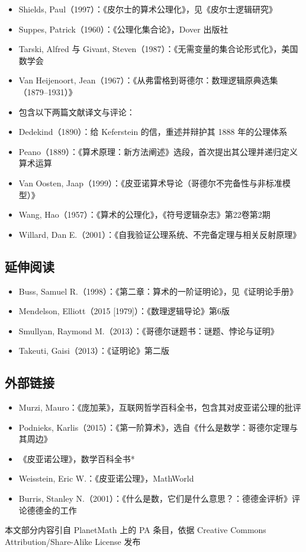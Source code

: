 \begin{itemize}
\item Shields, Paul（1997）：《皮尔士的算术公理化》，见《皮尔士逻辑研究》
\item Suppes, Patrick（1960）：《公理化集合论》，Dover 出版社
\item Tarski, Alfred 与 Givant, Steven（1987）：《无需变量的集合论形式化》，美国数学会
\item Van Heijenoort, Jean（1967）：《从弗雷格到哥德尔：数理逻辑原典选集（1879–1931）》
\item 包含以下两篇文献译文与评论：
\item Dedekind（1890）：给 Keferstein 的信，重述并辩护其 1888 年的公理体系
\item Peano（1889）：《算术原理：新方法阐述》选段，首次提出其公理并递归定义算术运算
\item  Van Oosten, Jaap（1999）：《皮亚诺算术导论（哥德尔不完备性与非标准模型）》
\item Wang, Hao（1957）：《算术的公理化》，《符号逻辑杂志》第22卷第2期
\item Willard, Dan E.（2001）：《自我验证公理系统、不完备定理与相关反射原理》
\end{itemize}
\subsection{延伸阅读}
\begin{itemize}
\item Buss, Samuel R.（1998）：《第二章：算术的一阶证明论》，见《证明论手册》
\item Mendelson, Elliott（2015 [1979]）：《数理逻辑导论》第6版
\item Smullyan, Raymond M.（2013）：《哥德尔谜题书：谜题、悖论与证明》
\item Takeuti, Gaisi（2013）：《证明论》第二版
\end{itemize}
\subsection{外部链接}
\begin{itemize}
\item Murzi, Mauro：《庞加莱》，互联网哲学百科全书，包含其对皮亚诺公理的批评
\item Podnieks, Karlis（2015）：《第一阶算术》，选自《什么是数学：哥德尔定理与其周边》
\item 《皮亚诺公理》，数学百科全书*
\item Weisstein, Eric W.：《皮亚诺公理》，MathWorld
\item Burris, Stanley N.（2001）：《什么是数，它们是什么意思？：德德金评析》评论德德金的工作
\end{itemize}
本文部分内容引自 PlanetMath 上的 PA 条目，依据 Creative Commons Attribution/Share-Alike License 发布


